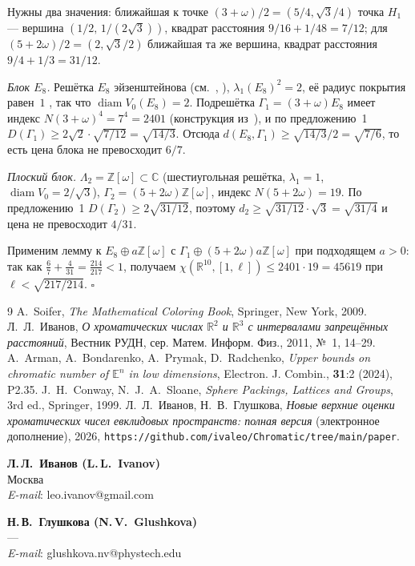 \documentclass{article}
\newcommand{\R}{\mathbb{R}}
\newcommand{\Z}{\mathbb{Z}}
\newcommand{\CC}{\mathbb{C}}
\newcommand{\diam}{\operatorname{diam}}
\begin{document}
Нужны два значения: ближайшая к точке $(3+\omega)/2=(5/4,\sqrt3/4)$ точка
$H_1$ --- вершина $(1/2,\,1/(2\sqrt3))$, квадрат расстояния $9/16+1/48=7/12$;
для $(5+2\omega)/2=(2,\sqrt3/2)$ ближайшая та же вершина, квадрат расстояния
$9/4+1/3=31/12$.

\emph{Блок $E_8$.} Решётка $E_8$ эйзенштейнова (см.~\cite{ABPR},
\cite{ConwaySloane}), $\lambda_1(E_8)^2=2$, её радиус покрытия равен~$1$
\cite[гл.~4]{ConwaySloane}, так что $\diam V_0(E_8)=2$. Подрешётка
$\Gamma_1=(3+\omega)E_8$ имеет индекс $N(3+\omega)^4=7^4=2401$
(конструкция из~\cite{ABPR}), и по предложению~1
$D(\Gamma_1)\ge2\sqrt2\cdot\sqrt{7/12}=\sqrt{14/3}$. Отсюда
$d(E_8,\Gamma_1)\ge\sqrt{14/3}\big/2=\sqrt{7/6}$, то есть цена блока не
превосходит $6/7$.

\emph{Плоский блок.} $\Lambda_2=\Z[\omega]\subset\CC$ (шестиугольная решётка,
$\lambda_1=1$, $\diam V_0=2/\sqrt3$), $\Gamma_2=(5+2\omega)\Z[\omega]$, индекс
$N(5+2\omega)=19$. По предложению~1 $D(\Gamma_2)\ge2\sqrt{31/12}$, поэтому
$d_2\ge\sqrt{31/12}\cdot\sqrt3=\sqrt{31/4}$ и цена не превосходит $4/31$.

Применим лемму к $E_8\oplus a\Z[\omega]$ с
$\Gamma_1\oplus(5+2\omega)a\Z[\omega]$ при подходящем $a>0$: так как
$\frac67+\frac4{31}=\frac{214}{217}<1$, получаем
$\chi(\R^{10},[1,\ell])\le2401\cdot19=45619$ при $\ell<\sqrt{217/214}$.
$\square$

\begin{thebibliography}{9}
 A.~Soifer, \emph{The Mathematical Coloring Book}, Springer,
New York, 2009.
 Л.~Л.~Иванов, \emph{О хроматических числах $\R^2$ и $\R^3$
с интервалами запрещённых расстояний}, Вестник РУДН, сер. Матем. Информ. Физ.,
2011, №~1, 14--29.
 A.~Arman, A.~Bondarenko, A.~Prymak, D.~Radchenko, \emph{Upper
bounds on chromatic number of $\mathbb E^n$ in low dimensions}, Electron. J.
Combin., \textbf{31}:2 (2024), P2.35.
 J.~H.~Conway, N.~J.~A.~Sloane, \emph{Sphere Packings,
Lattices and Groups}, 3rd ed., Springer, 1999.
 Л.~Л.~Иванов, Н.~В.~Глушкова, \emph{Новые верхние оценки
хроматических чисел евклидовых пространств: полная версия} (электронное
дополнение), 2026, \texttt{https://github.com/ivaleo/Chromatic/tree/main/paper}.
\end{thebibliography}

\noindent
\parbox[t]{0.5\textwidth}{{\bf Л.\,Л.~Иванов (L.\,L.~Ivanov)}\\
Москва\\
{\it E-mail}: leo.ivanov@gmail.com}%
\parbox[t]{0.5\textwidth}{{\bf Н.\,В.~Глушкова (N.\,V.~Glushkova)}\\
---\\
{\it E-mail}: glushkova.nv@phystech.edu}
\end{document}
